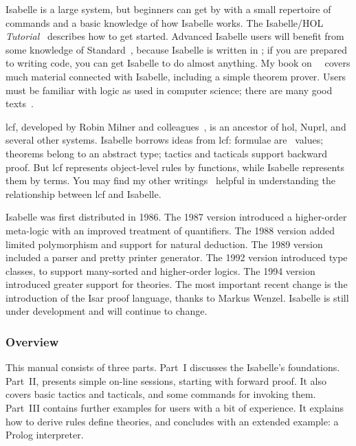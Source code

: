 \documentclass[12pt,a4paper]{article}
\begin{document}
Isabelle is a large system, but beginners can get by with a small
repertoire of commands and a basic knowledge of how Isabelle works.  
The Isabelle/HOL \emph{Tutorial}~\cite{isa-tutorial} describes how to get started. Advanced Isabelle users will benefit from some
knowledge of Standard~\ML{}, because Isabelle is written in \ML{};
if you are prepared to writing \ML{}
code, you can get Isabelle to do almost anything.  My book
on~\ML{}~\cite{paulson-ml2} covers much material connected with Isabelle,
including a simple theorem prover.  Users must be familiar with logic as
used in computer science; there are many good
texts~\cite{galton90,reeves90}.

{\sc lcf}, developed by Robin Milner and colleagues~\cite{mgordon79}, is an
ancestor of {\sc hol}, Nuprl, and several other systems.  Isabelle borrows
ideas from {\sc lcf}: formulae are~\ML{} values; theorems belong to an
abstract type; tactics and tacticals support backward proof.  But {\sc lcf}
represents object-level rules by functions, while Isabelle represents them
by terms.  You may find my other writings~\cite{paulson87,paulson-handbook}
helpful in understanding the relationship between {\sc lcf} and Isabelle.

 Isabelle was first distributed in 1986.
The 1987 version introduced a higher-order meta-logic with an improved
treatment of quantifiers.  The 1988 version added limited polymorphism and
support for natural deduction.  The 1989 version included a parser and
pretty printer generator.  The 1992 version introduced type classes, to
support many-sorted and higher-order logics.  The 1994 version introduced
greater support for theories.  The most important recent change is the
introduction of the Isar proof language, thanks to Markus Wenzel.  
Isabelle is still under
development and will continue to change.

\subsubsection*{Overview} 
This manual consists of three parts.  Part~I discusses the Isabelle's
foundations.  Part~II, presents simple on-line sessions, starting with
forward proof.  It also covers basic tactics and tacticals, and some
commands for invoking them.  Part~III contains further examples for users
with a bit of experience.  It explains how to derive rules define theories,
and concludes with an extended example: a Prolog interpreter.
\end{document}
